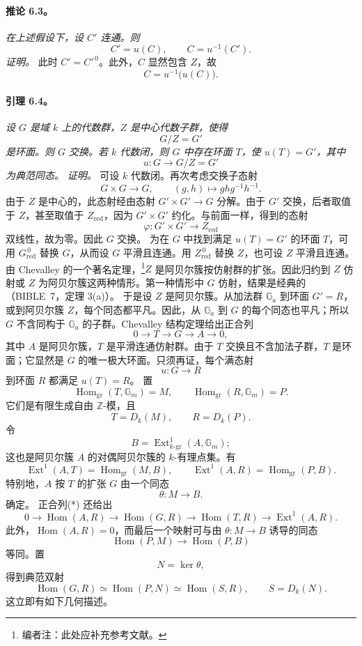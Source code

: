 \paragraph{\textbf{推论 6.3。}}
\emph{在上述假设下，设 \(C'\) 连通。则
\[
  C'=u(C),
  \qquad
  C=u^{-1}(C').
\]
}
\emph{证明。}
此时 \(C'=C'^{\,0}\)。此外，\(C\) 显然包含 \(Z\)，故
\[
  C=u^{-1}\bigl(u(C)\bigr).
\]
\paragraph{\textbf{引理 6.4。}}
\emph{设 \(G\) 是域 \(k\) 上的代数群，\(Z\) 是中心代数子群，使得
\[
  G/Z=G'
\]
是环面。则 \(G\) 交换。若 \(k\) 代数闭，则 \(G\) 中存在环面 \(T\)，使 \(u(T)=G'\)，其中
\[
  u:G\longrightarrow G/Z=G'
\]
为典范同态。}
\emph{证明。}
可设 \(k\) 代数闭。再次考虑交换子态射
\[
  G\times G\longrightarrow G,\qquad
  (g,h)\longmapsto ghg^{-1}h^{-1}.
\]
由于 \(Z\) 是中心的，此态射经由态射 \(G'\times G'\to G\) 分解。由于 \(G'\) 交换，后者取值于 \(Z\)，甚至取值于 \(Z_{\mathrm{red}}\)，因为 \(G'\times G'\) 约化。与前面一样，得到的态射
\[
  \varphi:G'\times G'\longrightarrow Z_{\mathrm{red}}
\]
双线性，故为零。因此 \(G\) 交换。
为在 \(G\) 中找到满足 \(u(T)=G'\) 的环面 \(T\)，可用 \(G_{\mathrm{red}}^{\,0}\) 替换 \(G\)，从而设 \(G\) 平滑且连通。用 \(Z_{\mathrm{red}}^{\,0}\) 替换 \(Z\)，也可设 \(Z\) 平滑且连通。由 Chevalley 的一个著名定理，\footnote{编者注：此处应补充参考文献。}\(Z\) 是阿贝尔簇按仿射群的扩张。因此归约到 \(Z\) 仿射或 \(Z\) 为阿贝尔簇这两种情形。第一种情形中 \(G\) 仿射，结果是经典的\textup{（BIBLE~7，定理 3(a)）}。
于是设 \(Z\) 是阿贝尔簇。从加法群 \(\mathbb G_a\) 到环面 \(G'=R\)，或到阿贝尔簇 \(Z\)，每个同态都平凡。因此，从 \(\mathbb G_a\) 到 \(G\) 的每个同态也平凡；所以 \(G\) 不含同构于 \(\mathbb G_a\) 的子群。Chevalley 结构定理给出正合列
\[
  0\longrightarrow T\longrightarrow G\longrightarrow A
  \longrightarrow 0, \tag{*}\label{sga3:xii:lemma:6-4:equation:star}
\]
其中 \(A\) 是阿贝尔簇，\(T\) 是平滑连通仿射群。由于 \(T\) 交换且不含加法子群，\(T\) 是环面；它显然是 \(G\) 的唯一极大环面。只须再证，每个满态射
\[
  u:G\longrightarrow R
\]
到环面 \(R\) 都满足 \(u(T)=R\)。
置
\[
  \operatorname{Hom}_{\mathrm{gr}}(T,\mathbb G_m)=M,
  \qquad
  \operatorname{Hom}_{\mathrm{gr}}(R,\mathbb G_m)=P.
\]
它们是有限生成自由 \(\mathbb Z\)-模，且
\[
  T=D_k(M),\qquad R=D_k(P).
\]
令
\[
  B=\operatorname{Ext}^{1}_{k\text{-gr}}(A,\mathbb G_m);
\]
这也是阿贝尔簇 \(A\) 的对偶阿贝尔簇的 \(k\)-有理点集。有
\[
  \operatorname{Ext}^{1}(A,T)
    =\operatorname{Hom}_{\mathrm{gr}}(M,B),
  \qquad
  \operatorname{Ext}^{1}(A,R)
    =\operatorname{Hom}_{\mathrm{gr}}(P,B). \tag{**}\label{sga3:xii:lemma:6-4:equation:double-star}
\]
特别地，\(A\) 按 \(T\) 的扩张 \(G\) 由一个同态
\[
  \theta:M\longrightarrow B.
\]
确定。
正合列\textup{(*)} 还给出
\[
  0\longrightarrow \operatorname{Hom}(A,R)
  \longrightarrow \operatorname{Hom}(G,R)
  \longrightarrow \operatorname{Hom}(T,R)
  \longrightarrow \operatorname{Ext}^{1}(A,R).
\]
此外，\(\operatorname{Hom}(A,R)=0\)，而最后一个映射可与由 \(\theta:M\to B\) 诱导的同态
\[
  \operatorname{Hom}(P,M)\longrightarrow
  \operatorname{Hom}(P,B)
\]
等同。置
\[
  N=\ker\theta,
\]
得到典范双射
\[
  \operatorname{Hom}(G,R)
  \simeq \operatorname{Hom}(P,N)
  \simeq \operatorname{Hom}(S,R),
  \qquad S=D_k(N).
\]
这立即有如下几何描述。
